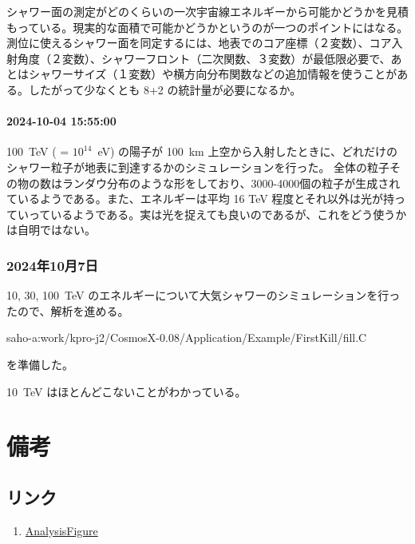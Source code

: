 \documentclass[uplatex]{jreport}
\begin{document}
シャワー面の測定がどのくらいの一次宇宙線エネルギーから可能かどうかを見積もっている。現実的な面積で可能かどうかというのが一つのポイントにはなる。測位に使えるシャワー面を同定するには、地表でのコア座標（２変数）、コア入射角度（２変数）、シャワーフロント（二次関数、３変数）が最低限必要で、あとはシャワーサイズ（１変数）や横方向分布関数などの追加情報を使うことがある。したがって少なくとも 8+2 の統計量が必要になるか。

\subsubsection*{2024-10-04 15:55:00}


100~TeV ( = $10^14$~eV) の陽子が 100~km 上空から入射したときに、どれだけのシャワー粒子が地表に到達するかのシミュレーションを行った。
全体の粒子その物の数はランダウ分布のような形をしており、3000-4000個の粒子が生成されているようである。また、エネルギーは平均 16 TeV 程度とそれ以外は光が持っていっているようである。実は光を捉えても良いのであるが、これをどう使うかは自明ではない。


\subsection*{2024年10月7日}

10, 30, 100~TeV のエネルギーについて大気シャワーのシミュレーションを行ったので、解析を進める。

saho-a:work/kpro-j2/CosmosX-0.08/Application/Example/FirstKill/fill.C 

を準備した。

10~TeV はほとんどこないことがわかっている。






\begin{qbox}

\end{qbox}

\chapter{備考}

\section{リンク}

\begin{enumerate}
   \item \href{https://docs.google.com/presentation/d/1BCVQIh1KB5iD7EcsCdXNliNvB-iTqdv0GNHVQUjJbzs/edit#slide=id.g836f55c689_0_560}{AnalysisFigure}



\end{enumerate}
\end{document}
